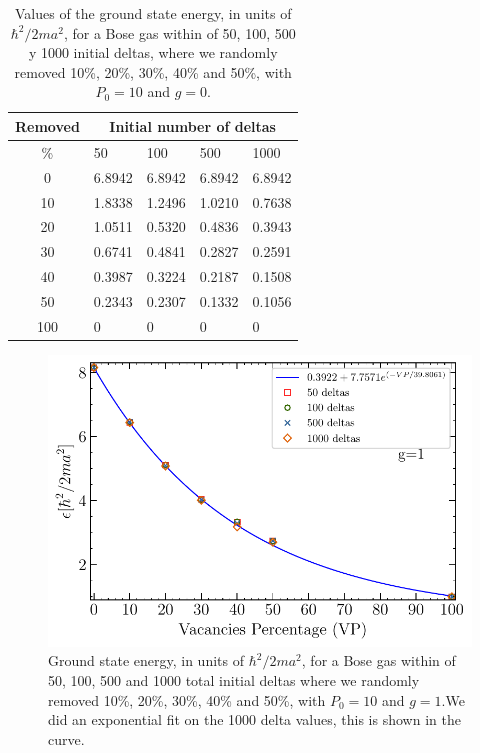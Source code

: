 \documentclass[twocolumn,showpacs,showkeys,preprintnumbers,superscriptaddress, pra, 10pt, aps]{revtex4-2}
\begin{document}
\begin{table}[H]
  \begin{center}
    \begin{tabular}{c|llll}
      \toprule
      Removed & \multicolumn{4}{c}{Initial number of deltas}                            \\
      \midrule
      \%      & 50                                           & 100    & 500    & 1000   \\ \hline
      0       & 6.8942                                       & 6.8942 & 6.8942 & 6.8942 \\
      10      & 1.8338                                       & 1.2496 & 1.0210 & 0.7638 \\
      20      & 1.0511                                       & 0.5320 & 0.4836 & 0.3943 \\
      30      & 0.6741                                       & 0.4841 & 0.2827 & 0.2591 \\
      40      & 0.3987                                       & 0.3224 & 0.2187 & 0.1508 \\
      50      & 0.2343                                       & 0.2307 & 0.1332 & 0.1056 \\
      100     & 0                                            & 0      & 0      & 0      \\
      \bottomrule
    \end{tabular}
    \caption{ Values of the ground state energy, in units of $\hbar^2/2ma^2$, for a Bose gas within of  50, 100, 500 y 1000 initial deltas, where we randomly removed 10\%, 20\%, 30\%, 40\% and 50\%, with $P_0 = 10$ and $g = 0$.}
    \label{table:tabla1}
  \end{center}
\end{table}


\begin{figure}[H]
  \centering
  \includegraphics[width=\linewidth]{g1.pdf}
  \caption{Ground state energy, in units of $\hbar^2/2ma^2$, for a Bose gas within of 50, 100, 500 and 1000 total initial deltas where we randomly removed 10\%, 20\%, 30\%, 40\% and 50\%, with $P_0 = 10$ and $g = 1$.We did an exponential fit on the 1000 delta values, this is shown in the curve.}%
  \label{fig:Energiasg1}
\end{figure}
\end{document}
